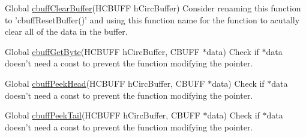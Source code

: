 \label{todo__todo000001}
\hypertarget{todo__todo000001}{}
 
\begin{DoxyDescription}
\item[Global \hyperlink{group___c_b_u_f_fclear_buffer_functions_ga93457699516cf451eb9736952f1760d0}{cbuffClearBuffer}(HCBUFF hCircBuffer) ]Consider renaming this function to 'cbuffResetBuffer()' and using this function name for the function to acutally clear all of the data in the buffer. 
\end{DoxyDescription}

\label{todo__todo000002}
\hypertarget{todo__todo000002}{}
 
\begin{DoxyDescription}
\item[Global \hyperlink{group___c_b_u_f_fput_get_functions_gafef77f05cad83c77f2a52e2e7477e3bc}{cbuffGetByte}(HCBUFF hCircBuffer, CBUFF $\ast$data) ]Check if $\ast$data doesn't need a const to prevent the function modifying the pointer. 
\end{DoxyDescription}

\label{todo__todo000004}
\hypertarget{todo__todo000004}{}
 
\begin{DoxyDescription}
\item[Global \hyperlink{group___c_b_u_f_fpeek_buffer_functions_ga52d817b014ba86d30009afd4197392bf}{cbuffPeekHead}(HCBUFF hCircBuffer, CBUFF $\ast$data) ]Check if $\ast$data doesn't need a const to prevent the function modifying the pointer. 
\end{DoxyDescription}

\label{todo__todo000003}
\hypertarget{todo__todo000003}{}
 
\begin{DoxyDescription}
\item[Global \hyperlink{group___c_b_u_f_fpeek_buffer_functions_ga4b431b4317e2f75b549b062530ecd9a3}{cbuffPeekTail}(HCBUFF hCircBuffer, CBUFF $\ast$data) ]Check if $\ast$data doesn't need a const to prevent the function modifying the pointer. 
\end{DoxyDescription}